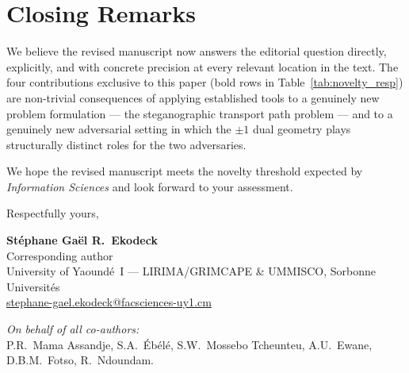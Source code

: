 \documentclass[12pt,a4paper]{article}
\begin{document}
\section*{Closing Remarks}

We believe the revised manuscript now answers the editorial question directly,
explicitly, and with concrete precision at every relevant location in the text.
The four contributions exclusive to this paper (bold rows in
Table~\ref{tab:novelty_resp}) are non-trivial consequences of applying
established tools to a genuinely new problem formulation --- the
steganographic transport path problem --- and to a genuinely new adversarial
setting in which the $\pm1$ dual geometry plays structurally distinct roles for
the two adversaries.

We hope the revised manuscript meets the novelty threshold expected by
\textit{Information Sciences} and look forward to your assessment.

\bigskip
Respectfully yours,

\medskip
\textbf{St\'ephane Ga\"el R.\ Ekodeck}\\
Corresponding author\\
University of Yaound\'e~I --- LIRIMA/GRIMCAPE \& UMMISCO, Sorbonne Universit\'es\\
\href{mailto:stephane-gael.ekodeck@facsciences-uy1.cm}
     {stephane-gael.ekodeck@facsciences-uy1.cm}

\medskip
\textit{On behalf of all co-authors:}\\
P.R.\ Mama Assandje,
S.A.\ \'Eb\'el\'e,
S.W.\ Mossebo Tcheunteu,
A.U.\ Ewane,
D.B.M.\ Fotso,
R.\ Ndoundam.
\end{document}
